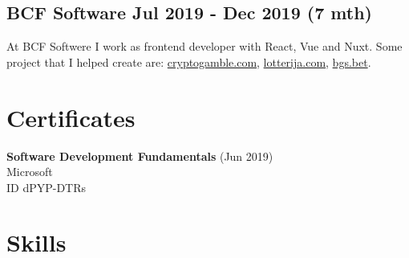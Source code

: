 \documentclass[10pt]{article}
\begin{document}
\subsection{BCF Software Jul 2019 - Dec 2019 (7 mth) }
At BCF Softwere I work as frontend developer with React, Vue and Nuxt. Some project that I helped create are:
    \href{https://cryptogamble.com}{cryptogamble.com}, \href{https://lotterija.com}{lotterija.com}, \href{https://bgs.bet}{bgs.bet}.
\section{Certificates}
\Large \textbf{Software Development Fundamentals} (Jun 2019) \vspace{0.3em}\\
\large Microsoft \vspace{0.5em} \\
\small ID dPYP-DTRs \\
\newpage
\section{Skills}
\end{document}
